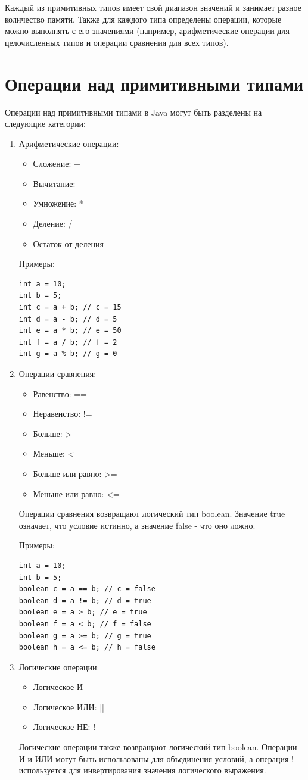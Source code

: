 Каждый из примитивных типов имеет свой диапазон значений и занимает разное количество памяти. Также для каждого типа определены операции, которые можно выполнять с его значениями (например, арифметические операции для целочисленных типов и операции сравнения для всех типов).

\section{Операции над примитивными типами}

Операции над примитивными типами в Java могут быть разделены на следующие категории:

\begin{enumerate}
    \item Арифметические операции:
    \begin{itemize}
        \item Сложение: +
        \item Вычитание: -
        \item Умножение: *
        \item Деление: /
        \item Остаток от деления
    \end{itemize}
    Примеры:
    \begin{lstlisting}
int a = 10;
int b = 5;
int c = a + b; // c = 15
int d = a - b; // d = 5
int e = a * b; // e = 50
int f = a / b; // f = 2
int g = a % b; // g = 0
    \end{lstlisting}
    \item Операции сравнения:
    \begin{itemize}
        \item Равенство: ==
        \item Неравенство: !=
        \item Больше: >
        \item Меньше: <
        \item Больше или равно: >=
        \item Меньше или равно: <=
    \end{itemize}
    
    Операции сравнения возвращают логический тип boolean. Значение true означает, что условие истинно, а значение false - что оно ложно.

Примеры:
 \begin{lstlisting}
int a = 10;
int b = 5;
boolean c = a == b; // c = false
boolean d = a != b; // d = true
boolean e = a > b; // e = true
boolean f = a < b; // f = false
boolean g = a >= b; // g = true
boolean h = a <= b; // h = false
    \end{lstlisting}
    \item Логические операции:
    \begin{itemize}
        \item Логическое И
        \item Логическое ИЛИ: ||
        \item Логическое НЕ: !
    \end{itemize}
    Логические операции также возвращают логический тип boolean. Операции И и ИЛИ могут быть использованы для объединения условий, а операция ! используется для инвертирования значения логического выражения.


\end{enumerate}
